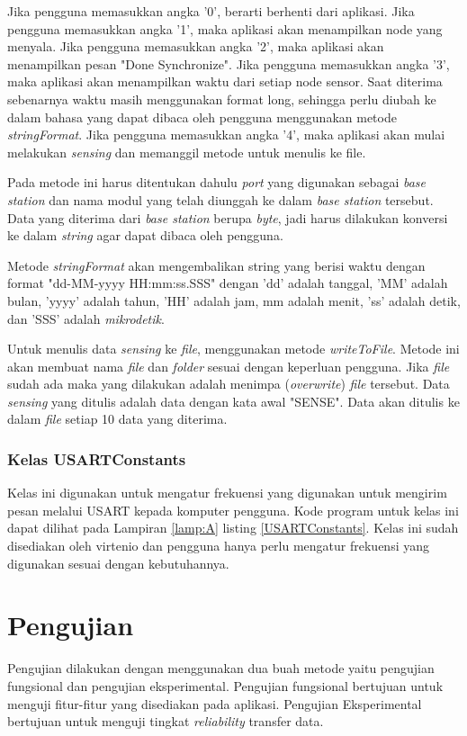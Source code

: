 Jika pengguna memasukkan angka '0', berarti berhenti dari aplikasi. Jika pengguna memasukkan angka '1', maka aplikasi akan menampilkan node yang menyala. Jika pengguna memasukkan angka '2', maka aplikasi akan menampilkan pesan "Done Synchronize". Jika pengguna memasukkan angka '3', maka aplikasi akan menampilkan waktu dari setiap node sensor. Saat diterima sebenarnya waktu masih menggunakan format long, sehingga perlu diubah ke dalam bahasa yang dapat dibaca oleh pengguna menggunakan metode \textit{stringFormat}. Jika pengguna memasukkan angka '4', maka aplikasi akan mulai melakukan \textit{sensing} dan memanggil metode untuk menulis ke file. 

Pada metode ini harus ditentukan dahulu \textit{port} yang digunakan sebagai \textit{base station} dan nama modul yang telah diunggah ke dalam \textit{base station} tersebut. Data yang diterima dari \textit{base station} berupa \textit{byte}, jadi harus dilakukan konversi ke dalam \textit{string} agar dapat dibaca oleh pengguna. 

Metode \textit{stringFormat} akan mengembalikan string yang berisi waktu dengan format "dd-MM-yyyy HH:mm:ss.SSS" dengan 'dd' adalah tanggal, 'MM' adalah bulan, 'yyyy' adalah tahun, 'HH' adalah jam, mm adalah menit, 'ss' adalah detik, dan 'SSS' adalah \textit{mikrodetik}. 

Untuk menulis data \textit{sensing} ke \textit{file}, menggunakan metode \textit{writeToFile}. Metode ini akan membuat nama \textit{file} dan \textit{folder} sesuai dengan keperluan pengguna. Jika \textit{file} sudah ada maka yang dilakukan adalah menimpa (\textit{overwrite}) \textit{file} tersebut. Data \textit{sensing} yang ditulis adalah data dengan kata awal "SENSE". Data akan ditulis ke dalam \textit{file} setiap 10 data yang diterima.

\subsubsection{Kelas USARTConstants}
Kelas ini digunakan untuk mengatur frekuensi yang digunakan untuk mengirim pesan melalui USART kepada komputer pengguna. Kode program untuk kelas ini dapat dilihat pada Lampiran \ref{lamp:A} listing \ref{USARTConstants}. Kelas ini sudah disediakan oleh virtenio dan pengguna hanya perlu mengatur frekuensi yang digunakan sesuai dengan kebutuhannya.

\section{Pengujian}
\label{sec:pengujian}
Pengujian dilakukan dengan menggunakan dua buah metode yaitu pengujian fungsional dan pengujian eksperimental. Pengujian fungsional bertujuan untuk menguji fitur-fitur yang disediakan pada aplikasi. Pengujian Eksperimental bertujuan untuk menguji tingkat \textit{reliability} transfer data.

